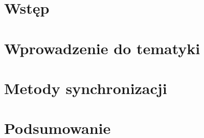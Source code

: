 \chapter{Wstęp}
\label{ch:wstep}


\chapter{Wprowadzenie do tematyki}
\label{ch:wprowadzenie_do_tematyki}


\chapter{Metody synchronizacji}
\label{ch:metody_synchronizacji}



\chapter{Podsumowanie}
\label{ch:podsumowanie}


% 